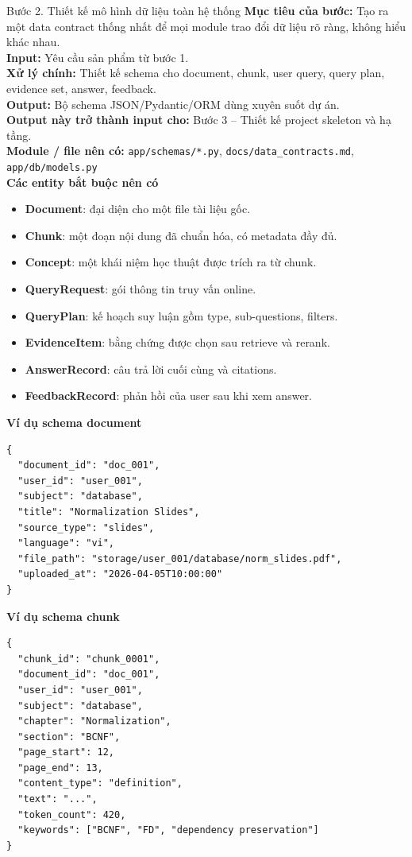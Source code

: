 \documentclass[12pt,a4paper]{article}
\newcommand{\stepgoal}[1]{\textbf{Mục tiêu của bước:} #1\\}
\newcommand{\stepinput}[1]{\textbf{Input:} #1\\}
\newcommand{\stepprocess}[1]{\textbf{Xử lý chính:} #1\\}
\newcommand{\stepoutput}[1]{\textbf{Output:} #1\\}
\newcommand{\stepnext}[1]{\textbf{Output này trở thành input cho:} #1\\}
\newcommand{\stepmodules}[1]{\textbf{Module / file nên có:} #1\\}
\begin{document}
\begin{stepbox}{Bước 2. Thiết kế mô hình dữ liệu toàn hệ thống}
\stepgoal{Tạo ra một data contract thống nhất để mọi module trao đổi dữ liệu rõ ràng, không hiểu khác nhau.}
\stepinput{Yêu cầu sản phẩm từ bước 1.}
\stepprocess{Thiết kế schema cho document, chunk, user query, query plan, evidence set, answer, feedback.}
\stepoutput{Bộ schema JSON/Pydantic/ORM dùng xuyên suốt dự án.}
\stepnext{Bước 3 -- Thiết kế project skeleton và hạ tầng.}
\stepmodules{\texttt{app/schemas/*.py}, \texttt{docs/data\_contracts.md}, \texttt{app/db/models.py}}

\textbf{Các entity bắt buộc nên có}
\begin{itemize}
    \item \textbf{Document}: đại diện cho một file tài liệu gốc.
    \item \textbf{Chunk}: một đoạn nội dung đã chuẩn hóa, có metadata đầy đủ.
    \item \textbf{Concept}: một khái niệm học thuật được trích ra từ chunk.
    \item \textbf{QueryRequest}: gói thông tin truy vấn online.
    \item \textbf{QueryPlan}: kế hoạch suy luận gồm type, sub-questions, filters.
    \item \textbf{EvidenceItem}: bằng chứng được chọn sau retrieve và rerank.
    \item \textbf{AnswerRecord}: câu trả lời cuối cùng và citations.
    \item \textbf{FeedbackRecord}: phản hồi của user sau khi xem answer.
\end{itemize}

\textbf{Ví dụ schema document}
\begin{lstlisting}
{
  "document_id": "doc_001",
  "user_id": "user_001",
  "subject": "database",
  "title": "Normalization Slides",
  "source_type": "slides",
  "language": "vi",
  "file_path": "storage/user_001/database/norm_slides.pdf",
  "uploaded_at": "2026-04-05T10:00:00"
}
\end{lstlisting}

\textbf{Ví dụ schema chunk}
\begin{lstlisting}
{
  "chunk_id": "chunk_0001",
  "document_id": "doc_001",
  "user_id": "user_001",
  "subject": "database",
  "chapter": "Normalization",
  "section": "BCNF",
  "page_start": 12,
  "page_end": 13,
  "content_type": "definition",
  "text": "...",
  "token_count": 420,
  "keywords": ["BCNF", "FD", "dependency preservation"]
}
\end{lstlisting}
\end{stepbox}
\end{document}
